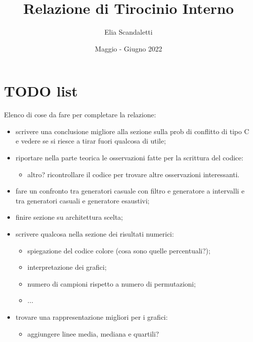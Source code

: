 

\title{Relazione di Tirocinio Interno}
\author{Elia Scandaletti}
\date{Maggio - Giugno 2022}



\maketitle
\tableofcontents

\section*{TODO list}
Elenco di cose da fare per completare la relazione:
\begin{itemize}
    \item scrivere una conclusione migliore alla sezione sulla prob di conflitto di tipo C e vedere se si riesce a tirar fuori qualcosa di utile;
    \item riportare nella parte teorica le osservazioni fatte per la scrittura del codice:
          \begin{itemize}
              \item altro? ricontrollare il codice per trovare altre osservazioni interessanti.
          \end{itemize}
    \item fare un confronto tra generatori casuale con filtro e generatore a intervalli e tra generatori casuali e generatore esaustivi;
    \item finire sezione su architettura scelta;
    \item scrivere qualcosa nella sezione dei risultati numerici:
          \begin{itemize}
              \item spiegazione del codice colore (cosa sono quelle percentuali?);
              \item interpretazione dei grafici;
              \item numero di campioni rispetto a numero di permutazioni;
              \item ...
          \end{itemize}
    \item trovare una rappresentazione migliori per i grafici:
          \begin{itemize}
              \item aggiungere linee media, mediana e quartili?
          \end{itemize}
\end{itemize}

